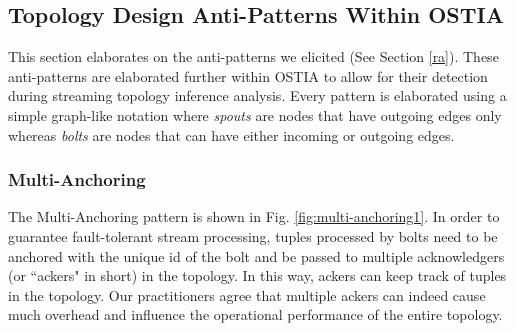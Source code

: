 
\subsection{Topology Design Anti-Patterns Within OSTIA}\label{sec:anti-pattern}
This section elaborates on the anti-patterns we elicited (See Section \ref{ra}). These anti-patterns are elaborated further within OSTIA to allow for their detection during streaming topology inference analysis. Every pattern is elaborated using a simple graph-like notation where \emph{spouts} are nodes that have outgoing edges only whereas \emph{bolts} are nodes that can have either incoming or outgoing edges.

\subsubsection{Multi-Anchoring}
The Multi-Anchoring pattern is shown in Fig. \ref{fig:multi-anchoring1}. In order to guarantee fault-tolerant stream processing, tuples processed by bolts need to be anchored with the unique {\sf id} of the bolt and be passed to multiple acknowledgers (or ``ackers" in short) in the topology. In this way, ackers can keep track of tuples in the topology. Our practitioners agree that multiple ackers can indeed cause much overhead and influence the operational performance of the entire topology.


